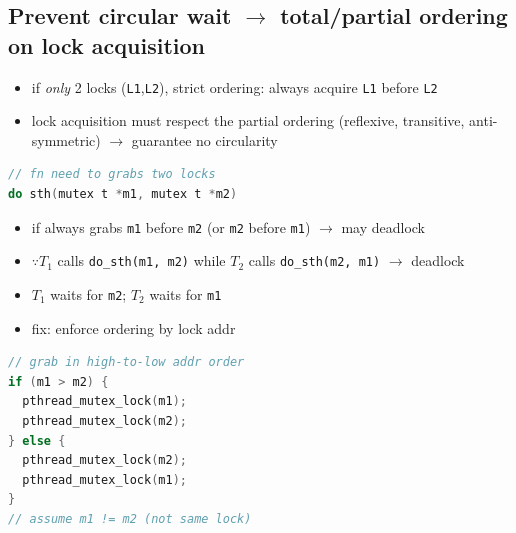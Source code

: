 \documentclass[8pt,a4paper,landscape]{extarticle}
\begin{document}
\begin{multicols*}{3}
\section*{Prevent circular wait $\to$ total/partial ordering on lock acquisition}
\begin{itemize}
\item if \emph{only} 2 locks (\texttt{L1},\texttt{L2}), strict ordering: always acquire \texttt{L1} before \texttt{L2}
\item lock acquisition must respect the partial ordering (reflexive, transitive, anti-symmetric) $\to$ guarantee no circularity
\end{itemize}
\begin{minipage}{0.5\linewidth}
\begin{lstlisting}[language=c,xleftmargin=2pt]
// fn need to grabs two locks
do sth(mutex t *m1, mutex t *m2)
\end{lstlisting}
  \begin{itemize}
  \item if always grabs \texttt{m1} before \texttt{m2} (or \texttt{m2} before \texttt{m1}) $\to$ may deadlock
  \item $\because T_1$ calls \texttt{do\_sth(m1, m2)} while $T_2$ calls \texttt{do\_sth(m2, m1)} $\to$ deadlock
  \item $T_1$ waits for \texttt{m2}; $T_2$ waits for \texttt{m1}
  \item fix: enforce ordering by lock addr
  \end{itemize}
\end{minipage}
\begin{minipage}{0.5\linewidth}
\begin{lstlisting}[language=c,xleftmargin=4pt,framextopmargin=1pt]
// grab in high-to-low addr order
if (m1 > m2) {
  pthread_mutex_lock(m1);
  pthread_mutex_lock(m2);
} else {
  pthread_mutex_lock(m2);
  pthread_mutex_lock(m1);
}
// assume m1 != m2 (not same lock)
\end{lstlisting}
\end{minipage}

\end{multicols*}
\end{document}
